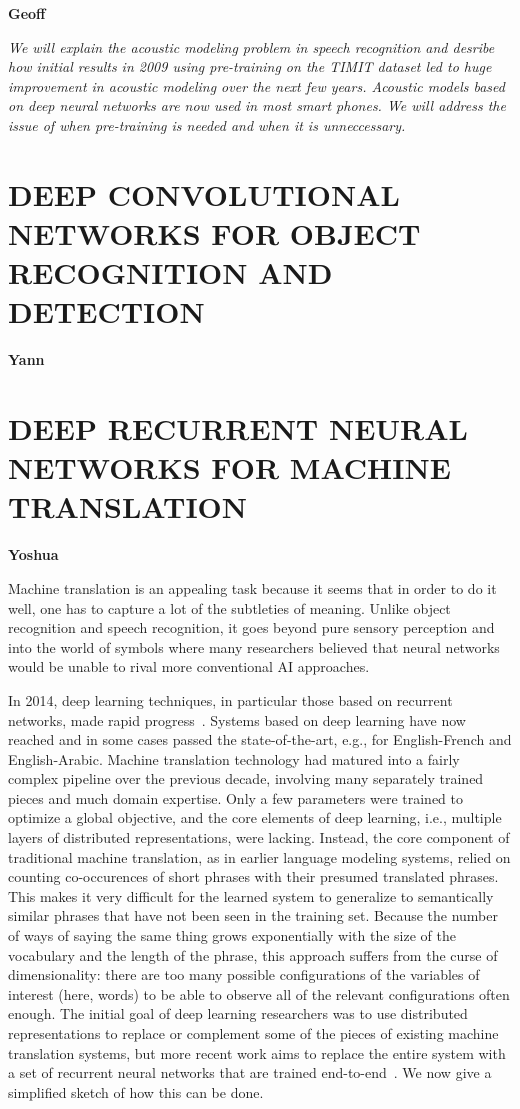 \documentclass[11pt]{article} %
\begin{document}
{\bf Geoff}

{\em We will explain the acoustic modeling problem in speech recognition and
 desribe how initial results in 2009 using pre-training on the TIMIT
 dataset led to huge improvement in acoustic modeling over the next few
 years. Acoustic models based on deep neural networks are now used in most
 smart phones.  We will address the issue of when pre-training is needed
 and when it is unneccessary.
}

\section{DEEP CONVOLUTIONAL NETWORKS FOR OBJECT RECOGNITION AND DETECTION}


{\bf Yann}


\section{DEEP RECURRENT NEURAL NETWORKS FOR MACHINE TRANSLATION}


{\bf Yoshua}


Machine translation is an appealing task because it seems that in order to
do it well, one has to capture a lot of the subtleties of meaning. Unlike
object recognition and speech recognition, it goes beyond pure sensory
perception and into the world of symbols where many researchers believed
that neural networks would be unable to rival more conventional AI
approaches.


In 2014, deep learning techniques, in particular those based on recurrent
networks, made rapid
progress~\citep{Devlin-et-al-ACL2014,Bahdanau-et-al-arxiv2014,Sutskever-et-al-arxiv2014}. Systems
based on deep learning have now reached and in some cases passed the
state-of-the-art, e.g., for English-French and English-Arabic. Machine
translation technology had matured into a fairly complex pipeline over the
previous decade, involving many separately trained pieces and much
domain expertise. Only a few parameters were trained to optimize a global
objective, and the core elements of deep learning, i.e., multiple layers of
distributed representations, were lacking. Instead, the core component of
traditional machine translation, as in earlier language modeling systems,
relied on counting co-occurences of short phrases with their presumed
translated phrases. This makes it very difficult for the learned system to
generalize to semantically similar phrases that have not been seen in the
training set. Because the number of ways of saying the same thing grows
exponentially with the size of the vocabulary and the length of the phrase,
this approach suffers from the curse of dimensionality: there are too many
possible configurations of the variables of interest (here, words) to be
able to observe all of the relevant configurations often enough. The
initial goal of deep learning researchers was to use distributed
representations to replace or complement some of the pieces of existing
machine translation systems, but more recent work aims to replace the
entire system with a set of recurrent neural networks that are trained
end-to-end~\citep{Bahdanau-et-al-arxiv2014,Sutskever-et-al-arxiv2014}.
We now give a simplified sketch of how this can be done.
\end{document}
